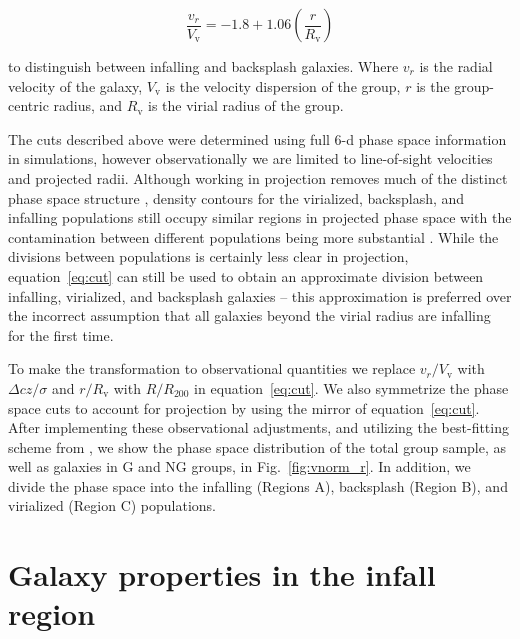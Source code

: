 \documentclass[a4paper,fleqn,usenatbib]{mnras}
\begin{document}
\begin{equation} \label{eq:cut}
  \frac{v_r}{V_\mathrm{v}} = -1.8 + 1.06
  \left(\frac{r}{R_\mathrm{v}}\right)
\end{equation}

\noindent
to distinguish between infalling and backsplash galaxies.  Where $v_r$
is the radial velocity of the galaxy, $V_\mathrm{v}$ is the velocity
dispersion of the group, $r$ is the group-centric radius, and
$R_\mathrm{v}$ is the virial radius of the group.
\par
The cuts described above were determined using full 6-d phase space
information in simulations, however observationally we are limited to
line-of-sight
velocities and projected radii.  Although working in projection
removes much of the distinct phase space structure \citep{oman2013, haines2015},
density contours for the virialized, backsplash, and infalling
populations still occupy similar regions in projected phase space
with the contamination between different populations being more substantial
\citep{mahajan2011}.  While the divisions between populations is
certainly less clear in projection, equation~\ref{eq:cut} can still be
used to obtain an approximate division between infalling, virialized,
and backsplash galaxies -- this approximation is preferred over
the incorrect assumption that all galaxies beyond the virial radius
are infalling for the first time.
\par
To make the transformation to observational quantities we replace
$v_r/V_\mathrm{v}$ with $\Delta cz/\sigma$ and $r/R_\mathrm{v}$ with
$R/R_{200}$ in equation~\ref{eq:cut}.  We also symmetrize the phase
space cuts to account for projection by using the mirror of
equation~\ref{eq:cut}.  After implementing these observational
adjustments, and utilizing the best-fitting scheme from
\citet{mahajan2011}, we show the phase space distribution of the total
group sample, as well as galaxies in G and NG groups, in
Fig.~\ref{fig:vnorm_r}.  In addition, we divide the phase space into
the infalling (Regions A), backsplash (Region B), and 
virialized (Region C) populations. 


\section{Galaxy properties in the infall region}
\label{sec:infall}
\end{document}
